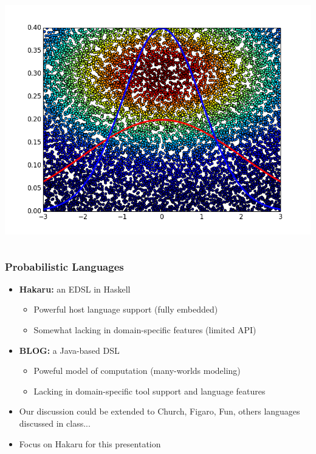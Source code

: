 \begin{frame}
\begin{columns}
  \includegraphics[width=\columnwidth]{metropolis_hastings.png}
\end{columns}
\end{frame}

\begin{frame} \frametitle{Probabilistic Languages}
\begin{itemize}
\item {\bf Hakaru:} an EDSL in Haskell
  \begin{itemize}
  \item Powerful host language support (fully embedded)
  \item Somewhat lacking in domain-specific features (limited API)
  \end{itemize}
\item {\bf BLOG:} a Java-based DSL
  \begin{itemize}
  \item Poweful model of computation (many-worlds modeling)
  \item Lacking in domain-specific tool support and language features
  \end{itemize}
\item Our discussion could be extended to Church, Figaro,
      Fun, others languages discussed in class...
\item Focus on Hakaru for this presentation
\end{itemize}
\end{frame}

